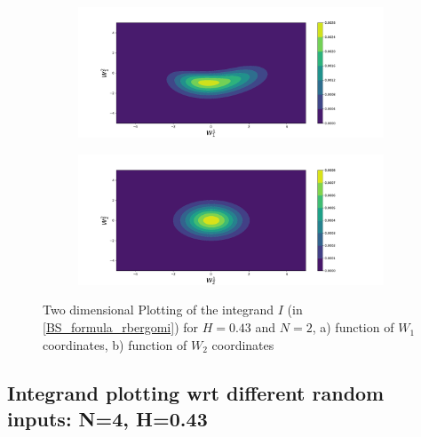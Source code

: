 \documentclass[11pt]{article}
\begin{document}
\begin{figure}[h!]
	\centering
	\begin{subfigure}{.5\textwidth}
		\centering
		\includegraphics[width=1\linewidth]{./figures/integrand_plotting_rBergomi/2D_plots/N_2/H_043/Bergomi_integrand_contours_K_1_H_043_W1_1_2_N_2}
		\caption{}
		\label{fig:sub3}
	\end{subfigure}%
	\begin{subfigure}{.5\textwidth}
		\centering
		\includegraphics[width=1\linewidth]{./figures/integrand_plotting_rBergomi/2D_plots/N_2/H_043/Bergomi_integrand_contours_K_1_H_043_W2_1_2_N_2}
		\caption{}
		\label{fig:sub4}
	\end{subfigure}
	\caption{Two dimensional Plotting of the integrand $I$ (in \eqref{BS_formula_rbergomi})  for $H=0.43$ and $N=2$, a)  function of $W_1$ coordinates, b) function of $W_2$ coordinates}
	\label{fig:Integrand_H_043_N_2_2D}
\end{figure}


\newpage
\subsection{Integrand plotting wrt different random inputs: N=4, H=0.43}
\end{document}
